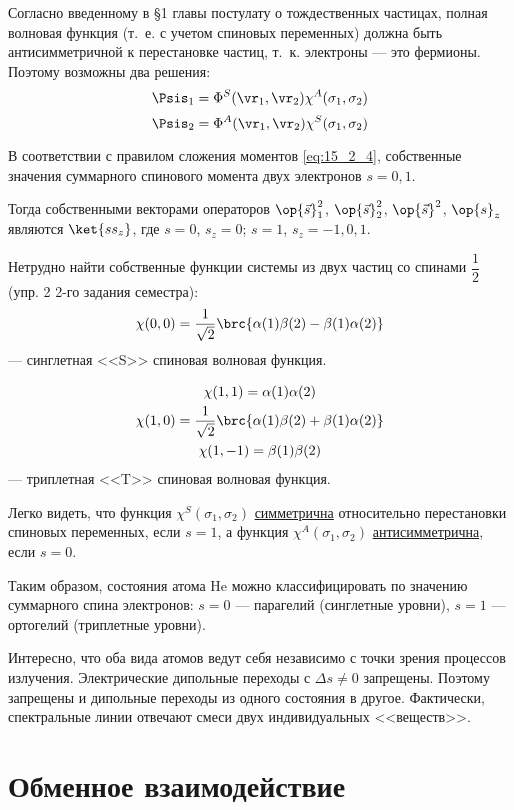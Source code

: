 Согласно введенному в \S 1 главы  постулату о тождественных частицах, полная волновая функция (т.~е. с учетом спиновых переменных) должна быть антисимметричной к перестановке частиц, т.~к. электроны --- это фермионы. Поэтому возможны два решения:
$$
\Psis_1 = \Phi^S(\vr_1, \vr_2) \chi^A(\sigma_1, \sigma_2)
$$
$$
\Psis_2 = \Phi^A(\vr_1, \vr_2) \chi^S(\sigma_1, \sigma_2)
$$

В соответствии с правилом сложения моментов \eqref{eq:15_2_4}, собственные значения суммарного спинового момента двух электронов $s = 0, 1$.

Тогда собственными векторами операторов $\op{\vec{s}}_1^2$, $\op{\vec{s}}_2^2$, $\op{\vec{s}}^2$, $\op{s}_z$ являются $\ket{s s_z}$, где $s = 0$, $s_z = 0$; $s = 1$, $s_z=-1, 0, 1$.

Нетрудно найти собственные функции системы из двух частиц со спинами $\dfrac{1}{2}$ (упр. 2 2-го задания  семестра):
$$
\chi(0, 0) = \frac{1}{\sqrt{2}}\brc{\alpha(1)\beta(2) - \beta(1)\alpha(2)}
$$
--- синглетная <<S>> спиновая волновая функция.

\begin{gather*}
\chi(1, 1) = \alpha(1)\alpha(2) \\
\chi(1, 0) = \frac{1}{\sqrt{2}}\brc{\alpha(1)\beta(2) + \beta(1)\alpha(2)} \\
\chi(1, -1) = \beta(1)\beta(2)
\end{gather*}
--- триплетная <<T>> спиновая волновая функция.

Легко видеть, что функция $\chi^S(\sigma_1, \sigma_2)$ \underline{симметрична} относительно перестановки спиновых переменных, если $s = 1$, а функция $\chi^A(\sigma_1, \sigma_2)$ \underline{антисимметрична}, если $s = 0$.

Таким образом, состояния атома He можно классифицировать по значению суммарного спина электронов: $s = 0$ --- парагелий (синглетные уровни), $s = 1$ --- ортогелий (триплетные уровни).

Интересно, что оба вида атомов ведут себя независимо с точки зрения процессов излучения. Электрические дипольные переходы с $\Delta s \neq 0$ запрещены. Поэтому запрещены и дипольные переходы из одного состояния в другое. Фактически, спектральные линии отвечают смеси двух индивидуальных <<веществ>>.

\section{Обменное взаимодействие}

